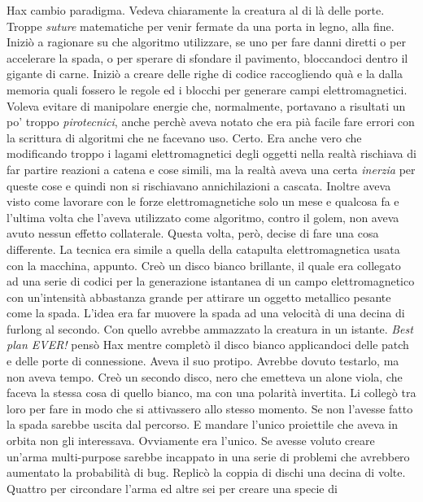     Hax cambio paradigma. Vedeva chiaramente la creatura al di là delle
    porte. Troppe \emph{suture} matematiche per venir fermate da una porta
    in legno, alla fine. Iniziò a ragionare su che algoritmo utilizzare, se
    uno per fare danni diretti o per accelerare la spada, o per sperare di
    sfondare il pavimento, bloccandoci dentro il gigante di carne. Iniziò a
    creare delle righe di codice raccogliendo quà e la dalla memoria quali
    fossero le regole ed i blocchi per generare campi elettromagnetici.
    Voleva evitare di manipolare energie che, normalmente, portavano a
    risultati un po' troppo \emph{pirotecnici}, anche perchè aveva notato
    che era pià facile fare errori con la scrittura di algoritmi che ne
    facevano uso. Certo. Era anche vero che modificando troppo i lagami
    elettromagnetici degli oggetti nella realtà rischiava di far partire
    reazioni a catena e cose simili, ma la realtà aveva una certa
    \emph{inerzia} per queste cose e quindi non si rischiavano
    annichilazioni a cascata. Inoltre aveva visto come lavorare con le
    forze elettromagnetiche solo un mese e qualcosa fa e l'ultima volta che
    l'aveva utilizzato come algoritmo, contro il golem, non aveva avuto
    nessun effetto collaterale. Questa volta, però, decise di fare una cosa
    differente. La tecnica era simile a quella della catapulta
    elettromagnetica usata con la macchina, appunto. Creò un disco bianco
    brillante, il quale era collegato ad una serie di codici per la
    generazione istantanea di un campo elettromagnetico con un'intensità
    abbastanza grande per attirare un oggetto metallico pesante come la
    spada. L'idea era far muovere la spada ad una velocità di una decina di
    furlong al secondo. Con quello avrebbe ammazzato la creatura in un
    istante. \emph{Best plan EVER!} pensò Hax mentre completò il disco
    bianco applicandoci delle patch e delle porte di connessione. Aveva il
    suo protipo. Avrebbe dovuto testarlo, ma non aveva tempo. Creò un
    secondo disco, nero che emetteva un alone viola, che faceva la stessa
    cosa di quello bianco, ma con una polarità invertita. Li collegò tra
    loro per fare in modo che si attivassero allo stesso momento. Se non
    l'avesse fatto la spada sarebbe uscita dal percorso. E mandare l'unico
    proiettile che aveva in orbita non gli interessava. Ovviamente era
    l'unico. Se avesse voluto creare un'arma multi-purpose sarebbe
    incappato in una serie di problemi che avrebbero aumentato la
    probabilità di bug. Replicò la coppia di dischi una decina di volte.
    Quattro per circondare l'arma ed altre sei per creare una specie di
